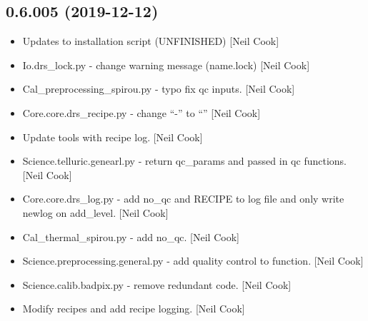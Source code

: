 \documentclass[a4paper,10pt,english]{report}
\begin{document}
\subsection{0.6.005 (2019-12-12)}
\label{\detokenize{misc/changelog:id12}}\begin{itemize}
\item {} 
Updates to installation script (UNFINISHED) {[}Neil Cook{]}

\item {} 
Io.drs\_lock.py - change warning message (name.lock) {[}Neil Cook{]}

\item {} 
Cal\_preprocessing\_spirou.py - typo fix qc inputs. {[}Neil Cook{]}

\item {} 
Core.core.drs\_recipe.py - change “-” to “\textendash{}” {[}Neil Cook{]}

\item {} 
Update tools with recipe log. {[}Neil Cook{]}

\item {} 
Science.telluric.genearl.py - return qc\_params and passed in qc
functions. {[}Neil Cook{]}

\item {} 
Core.core.drs\_log.py - add no\_qc and RECIPE to log file and only write
newlog on add\_level. {[}Neil Cook{]}

\item {} 
Cal\_thermal\_spirou.py - add no\_qc. {[}Neil Cook{]}

\item {} 
Science.preprocessing.general.py - add quality control to function.
{[}Neil Cook{]}

\item {} 
Science.calib.badpix.py - remove redundant code. {[}Neil Cook{]}

\item {} 
Modify recipes and add recipe logging. {[}Neil Cook{]}

\end{itemize}
\end{document}
